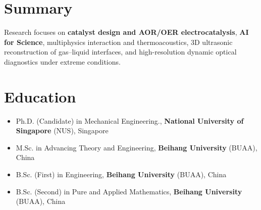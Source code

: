 \documentclass[a4paper,12pt]{article}
\begin{document}
\section{\textbf{Summary}}
Research focuses on \textbf{catalyst design and AOR/OER electrocatalysis}, \textbf{AI for Science}, multiphysics interaction and thermoacoustics, 3D ultrasonic reconstruction of gas--liquid interfaces, and high-resolution dynamic optical diagnostics under extreme conditions.

\section{\textbf{Education}}

\begin{itemize}[leftmargin=1.2em, itemsep=1pt, topsep=0pt]
    \item Ph.D. (Candidate) in Mechanical Engineering.,  \textbf{National University of Singapore} (NUS), Singapore
     \item M.Sc. in Advancing Theory and Engineering, \textbf{Beihang University} (BUAA), China 
    \item B.Sc. (First) in Engineering, \textbf{Beihang University} (BUAA), China 
    \item B.Sc. (Second) in Pure and Applied Mathematics, \textbf{Beihang University} (BUAA), China 
\end{itemize}


\end{document}

